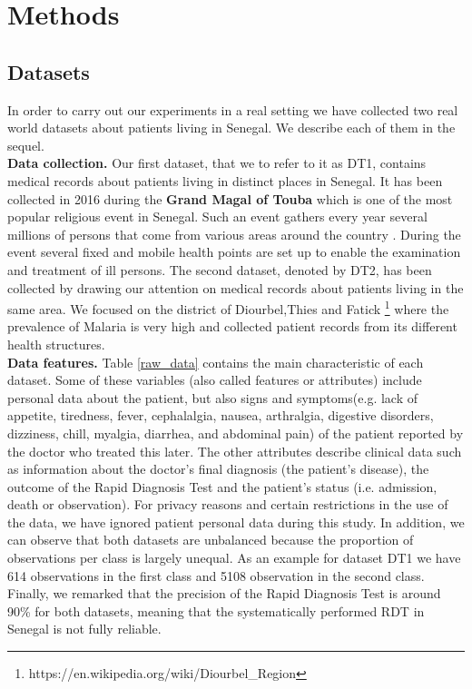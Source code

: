 \newpage
\section{Methods}\label{Methods}
\subsection{Datasets}
In order to carry out  our experiments in a real setting we have collected two real world datasets about patients living in Senegal. We describe each of them in the sequel.\\
\textbf{Data collection.} Our first dataset, that we  to refer to it as DT1, contains medical records about patients living in distinct places in Senegal. It has been collected in 2016 during the \textbf{Grand Magal of Touba}  which is one of the most popular religious event in Senegal. Such an event gathers every year several millions of persons that come from various areas around the country \cite{Ch17}.  During the event several fixed and mobile health points are set up to enable the examination and treatment of ill persons. The second dataset, denoted by DT2, has been collected by drawing our attention on medical records about patients living in the same area. We focused on the district of Diourbel,Thies and Fatick \footnote{https://en.wikipedia.org/wiki/Diourbel\_Region} where the prevalence of Malaria is very high and collected patient records from its different health structures. \\
\textbf{Data features.} Table \ref{raw_data} contains the main characteristic of each dataset. Some of these variables (also called features or attributes) include personal data about the patient, but also signs and symptoms(e.g. lack of appetite, tiredness, fever, cephalalgia, nausea,
arthralgia, digestive disorders, dizziness, chill, myalgia, diarrhea, and abdominal pain) of the patient reported by the doctor who treated this later. The other attributes describe clinical data such as information about the doctor's final diagnosis (the patient's disease), the outcome of the Rapid Diagnosis Test and the patient's status (i.e. admission, death or observation). For privacy reasons and certain restrictions in the use of the data, we have ignored patient personal data  during this study.
In addition, we can observe that  both datasets are unbalanced because the proportion of observations per class is largely unequal. As an example for dataset DT1 we have 614 observations in the first class and 5108 observation in the second class. Finally, we remarked that the precision of the Rapid Diagnosis Test is around 90\% for both datasets, meaning that the systematically performed RDT in Senegal is not fully reliable.
